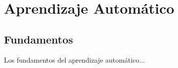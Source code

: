 \chapter{Aprendizaje Automático}

\section{Fundamentos}

Los fundamentos del aprendizaje automático...